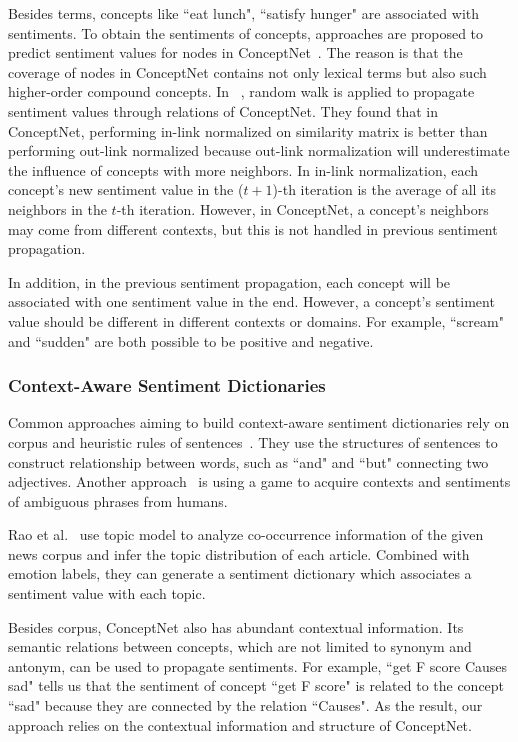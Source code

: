 Besides terms, concepts like ``eat lunch", ``satisfy hunger" are associated with sentiments. To obtain the sentiments of concepts, approaches are proposed to predict sentiment values for nodes in ConceptNet~\cite{Liu:IUI03, Cambria:AAAI10, Wu:TAAI11, Tsai:IEEE13, Wu:relSelect14}. The reason is that the coverage of nodes in ConceptNet contains not only lexical terms but also such higher-order compound concepts. In ~\cite{Tsai:IEEE13, Wu:relSelect14}, random walk is applied to propagate sentiment values through relations of ConceptNet. They found that in ConceptNet, performing in-link normalized on similarity matrix is better than performing out-link normalized because out-link normalization will underestimate the influence of concepts with more neighbors. In in-link normalization, each concept's new sentiment value in the ($t+1$)-th iteration is the average of all its neighbors in the $t$-th iteration. However, in ConceptNet, a concept's neighbors may come from different contexts, but this is not handled in previous sentiment propagation.

In addition, in the previous sentiment propagation, each concept will be associated with one sentiment value in the end. However, a concept's sentiment value should be different in different contexts or domains. For example, ``scream" and ``sudden" are both possible to be positive and negative. 

\subsubsection{Context-Aware Sentiment Dictionaries}
Common approaches aiming to build context-aware sentiment dictionaries rely on corpus and heuristic rules of sentences~\cite{Xu:PACLIC10, Xu:COLING10, Lu:WWW11}. They use the structures of sentences to construct relationship between words, such as ``and" and ``but" connecting two adjectives. Another approach~\cite{Boia:AAAI14} is using a game to acquire contexts and sentiments of ambiguous phrases from humans. 

Rao et al.~\cite{Rao:WWW14} use topic model to analyze co-occurrence information of the given news corpus and infer the topic distribution of each article. Combined with emotion labels, they can generate a sentiment dictionary which associates a sentiment value with each topic. 

Besides corpus, ConceptNet also has abundant contextual information. Its semantic relations between concepts, which are not limited to synonym and antonym, can be used to propagate sentiments. For example, ``get F score Causes sad" tells us that the sentiment of concept ``get F score" is related to the concept ``sad" because they are connected by the relation ``Causes". As the result, our approach relies on the contextual information and structure of ConceptNet.